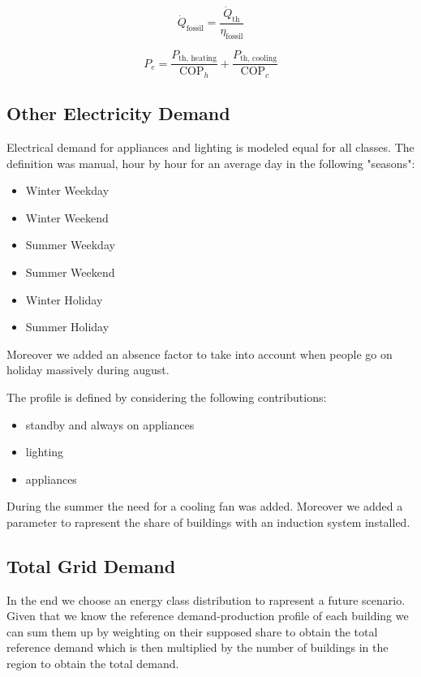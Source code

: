 \begin{equation}
    \dot{Q}_{\text{fossil}} = \frac{\dot{Q}_{\text{th}}}{\eta_{\text{fossil}}}
\end{equation}

\begin{equation}
    P_e = \frac{P_{\text{th, heating}}}{\text{COP}_{h}} + \frac{P_{\text{th, cooling}}}{\text{COP}_{c}}
\end{equation}

\subsection{Other Electricity Demand}
Electrical demand for appliances and lighting is modeled equal for all classes.
The definition was manual, hour by hour for an average day in the following "seasons":
\begin{itemize}
    \item Winter Weekday
    \item Winter Weekend
    \item Summer Weekday
    \item Summer Weekend
    \item Winter Holiday
    \item Summer Holiday
\end{itemize}
Moreover we added an absence factor to take into account when people go on holiday massively during august.

The profile is defined by considering the following contributions:
\begin{itemize}
    \item standby and always on appliances
    \item lighting 
    \item appliances
\end{itemize}
During the summer the need for a cooling fan was added.  
Moreover we added a parameter to rapresent the share of buildings with an induction system installed.


\subsection{Total Grid Demand}
In the end we choose an energy class distribution to rapresent a future scenario.
Given that we know the reference demand-production profile of each building we can sum them up by  weighting on their supposed share to obtain the total reference demand
which is then multiplied by the number of buildings in the region to obtain the total demand.

